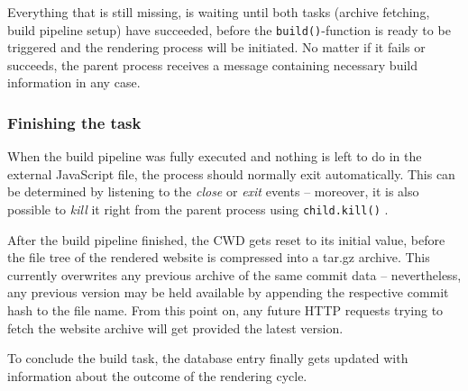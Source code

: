 Everything that is still missing, is waiting until both tasks (archive fetching, build pipeline setup) have succeeded, before the \texttt{build()}-function is ready to be triggered and the rendering process will be initiated. No matter if it fails or succeeds, the parent process receives a message containing necessary build information in any case.

\subsubsection{Finishing the task}
When the build pipeline was fully executed and nothing is left to do in the external JavaScript file, the process should normally exit automatically. This can be determined by listening to the \emph{close} or \emph{exit} events -- moreover, it is also possible to \emph{kill} it right from the parent process using \texttt{child.kill()} \cite{NodejsKillProcess}.

After the build pipeline finished, the CWD gets reset to its initial value, before the file tree of the rendered website is compressed into a tar.gz archive. This currently overwrites any previous archive of the same commit data -- nevertheless, any previous version may be held available by appending the respective commit hash to the file name. From this point on, any future HTTP requests trying to fetch the website archive will get provided the latest version.

To conclude the build task, the database entry finally gets updated with information about the outcome of the rendering cycle.
